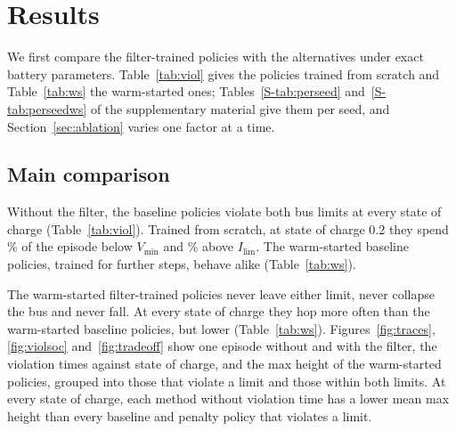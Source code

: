 \section{Results}\label{sec:results}
We first compare the filter-trained policies with the alternatives under exact battery parameters. Table~\ref{tab:viol} gives the policies trained from scratch and Table~\ref{tab:ws} the warm-started ones; Tables~\ref{S-tab:perseed} and~\ref{S-tab:perseedws} of the supplementary material give them per seed, and Section~\ref{sec:ablation} varies one factor at a time.

\subsection{Main comparison}\label{sec:main}
Without the filter, the baseline policies violate both bus limits at every state of charge (Table~\ref{tab:viol}). Trained from scratch, at state of charge 0.2 they spend \% of the episode below $V_{\min}$ and \% above $I_{\lim}$. The warm-started baseline policies, trained for  further steps, behave alike (Table~\ref{tab:ws}).

The warm-started filter-trained policies never leave either limit, never collapse the bus and never fall. At every state of charge they hop more often than the warm-started baseline policies, but lower (Table~\ref{tab:ws}).
Figures~\ref{fig:traces}, \ref{fig:violsoc} and~\ref{fig:tradeoff} show one episode without and with the filter, the violation times against state of charge, and the max height of the warm-started policies, grouped into those that violate a limit and those within both limits. At every state of charge, each method without violation time has a lower mean max height than every baseline and penalty policy that violates a limit.

